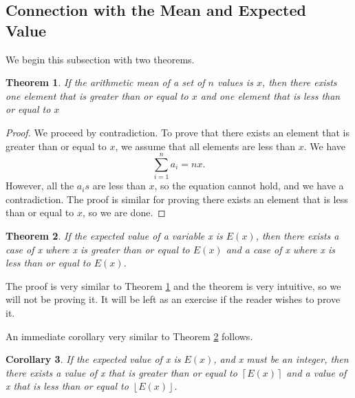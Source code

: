 \documentclass[l1pt]{article}
\theoremstyle{plain}
\newtheorem{thm}{Theorem}[section]
\newtheorem{corollary}[thm]{Corollary}
\theoremstyle{definition}
\theoremstyle{remark}
\begin{document}
\subsection{Connection with the Mean and Expected Value}
We begin this subsection with two theorems.

\begin{mdframed}
    \begin{thm}
    \label{thm:arithmetic mean}
    If the arithmetic mean of a set of $n$ values is $x$, then there exists one element that is greater than or equal to $x$ and one element that is less than or equal to $x$
    \end{thm}
\end{mdframed}

\begin{proof}
We proceed by contradiction. To prove that there exists an element that is greater than or equal to $x$, we assume that all elements are less than $x$. We have \[\sum_{i=1}^n a_i=nx .\] However, all the $a_is$ are less than $x$, so the equation cannot hold, and we have a contradiction. The proof is similar for proving there exists an element that is less than or equal to $x$, so we are done.
\end{proof}

\begin{mdframed}
    \begin{thm}
    \label{thm:expected value}
    If the expected value of a variable x is $E(x)$, then there exists a case of x where x is greater than or equal to $E(x)$ and a case of x where x is less than or equal to $E(x)$.
    \end{thm}
\end{mdframed}

The proof is very similar to Theorem \ref{thm:arithmetic mean} and the theorem is very intuitive, so we will not be proving it. It will be left as an exercise if the reader wishes to prove it. 

An immediate corollary very similar to Theorem \ref{thm:expected value} follows.

\begin{mdframed}
    \begin{corollary}
    \label{Corollary:Expected Value}
    If the expected value of x is $E(x)$, and x must be an integer, then there exists a value of x that is greater than or equal to $\left \lceil{E(x)}\right \rceil$ and a value of x that is less than or equal to $\left \lfloor{E(x)}\right \rfloor $.
    \end{corollary}
\end{mdframed}
\end{document}
